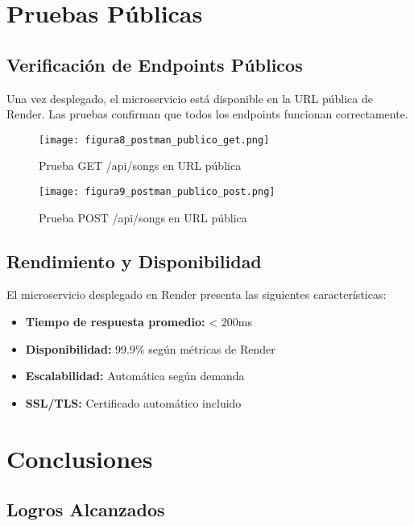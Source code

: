 \documentclass[12pt,a4paper]{article}
\begin{document}
\section{Pruebas Públicas}

\subsection{Verificación de Endpoints Públicos}

Una vez desplegado, el microservicio está disponible en la URL pública de Render. Las pruebas confirman que todos los endpoints funcionan correctamente.

\begin{figure}[H]
\centering
\texttt{[image: figura8\_postman\_publico\_get.png]}
\caption{Prueba GET /api/songs en URL pública}
\end{figure}

\begin{figure}[H]
\centering
\texttt{[image: figura9\_postman\_publico\_post.png]}
\caption{Prueba POST /api/songs en URL pública}
\end{figure}

\subsection{Rendimiento y Disponibilidad}

El microservicio desplegado en Render presenta las siguientes características:

\begin{itemize}
    \item \textbf{Tiempo de respuesta promedio:} < 200ms
    \item \textbf{Disponibilidad:} 99.9\% según métricas de Render
    \item \textbf{Escalabilidad:} Automática según demanda
    \item \textbf{SSL/TLS:} Certificado automático incluido
\end{itemize}

\section{Conclusiones}

\subsection{Logros Alcanzados}
\end{document}
